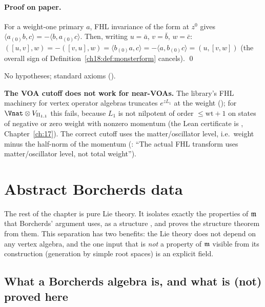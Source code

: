 \paragraph{Proof on paper.}  For a weight-one primary $a$, FHL invariance of the form at $z^0$ gives
$\langle a_{(0)}b,c\rangle=-\langle b,a_{(0)}c\rangle$.  Then, writing $u=\bar a$, $v=\bar b$, $w=\bar c$:
$([u,v],w)=-([v,u],w)=\langle b_{(0)}a,c\rangle=-\langle a,b_{(0)}c\rangle=(u,[v,w])$ (the overall sign of
Definition~\ref{ch18:def:monsterform} cancels). \qed
\begin{status}No hypotheses; standard axioms ().\end{status}

\begin{warning}
\textbf{The VOA cutoff does not work for near-VOAs.}  The library's FHL machinery for vertex operator algebras truncates
$e^{zL_1}$ at the weight (); for $\Vnat\otimes V_{\chXVIIIII}$ this fails, because $L_1$ is not nilpotent of
order $\le\mathrm{wt}+1$ on states of negative or zero weight with nonzero momentum (the Lean certificate is
, Chapter~\ref{ch:17}).  The correct cutoff uses the matter/oscillator
level, i.e.\ weight minus the half-norm of the momentum (: ``The actual
FHL transform uses matter/oscillator level, not total weight'').
\end{warning}

\section{Abstract Borcherds data}\label{ch18:sec:bd}

The rest of the chapter is pure Lie theory.  It isolates exactly the properties of $\mathfrak{m}$ that Borcherds' argument
uses, as a structure , and proves the structure theorem from them.  This separation has two benefits: the Lie theory does not depend on any
vertex algebra, and the one input that is \emph{not} a property of $\mathfrak{m}$ visible from its construction
(generation by simple root spaces) is an explicit field.

\subsection{What a Borcherds algebra is, and what is (not) proved here}\label{ch18:sec:bkm}

